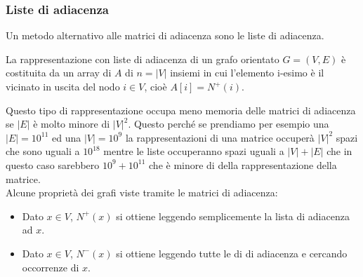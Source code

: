 \subsubsection{Liste di adiacenza}
Un metodo alternativo alle matrici di adiacenza sono le liste di adiacenza.
\begin{definition}
    La rappresentazione con liste di adiacenza di un grafo orientato $G = (V,E)$ è costituita da un array di $A$ di $n = |V|$ insiemi in cui l'elemento i-esimo è il vicinato in uscita del nodo $i \in V$, cioè $A[i] = N^+(i)$.
\end{definition}
Questo tipo di rappresentazione occupa meno memoria delle matrici di adiacenza se $|E|$ è molto minore di $|V|^2$. Questo perché se prendiamo per esempio una $|E| = 10^{11}$ ed una $|V| = 10^9$ la rappresentazioni di una matrice occuperà $|V|^2$ spazi che sono uguali a $10^{18}$ mentre le liste occuperanno spazi uguali a $|V| + |E|$ che in questo caso sarebbero $10^9 + 10^{11}$ che è minore di della rappresentazione della matrice.\\
Alcune proprietà dei grafi viste tramite le matrici di adiacenza:
\begin{itemize}
    \item Dato $x \in V$, $N^+(x)$ si ottiene leggendo semplicemente la lista di adiacenza ad $x$.
    \item Dato $x \in V$, $N^-(x)$ si ottiene leggendo tutte le di di adiacenza e cercando occorrenze di $x$.
\end{itemize}

